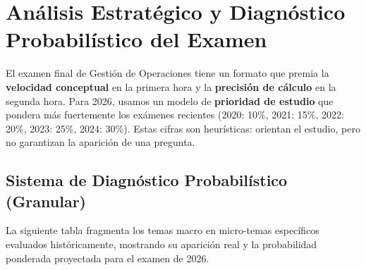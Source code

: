 \section{Análisis Estratégico y Diagnóstico Probabilístico del Examen}

El examen final de Gestión de Operaciones tiene un formato que premia la \textbf{velocidad conceptual} en la primera hora y la \textbf{precisión de cálculo} en la segunda hora. Para 2026, usamos un modelo de \textbf{prioridad de estudio} que pondera más fuertemente los exámenes recientes (2020: 10\%, 2021: 15\%, 2022: 20\%, 2023: 25\%, 2024: 30\%). Estas cifras son heurísticas: orientan el estudio, pero no garantizan la aparición de una pregunta.

\subsection{Sistema de Diagnóstico Probabilístico (Granular)}

La siguiente tabla fragmenta los temas macro en micro-temas específicos evaluados históricamente, mostrando su aparición real y la probabilidad ponderada proyectada para el examen de 2026.

